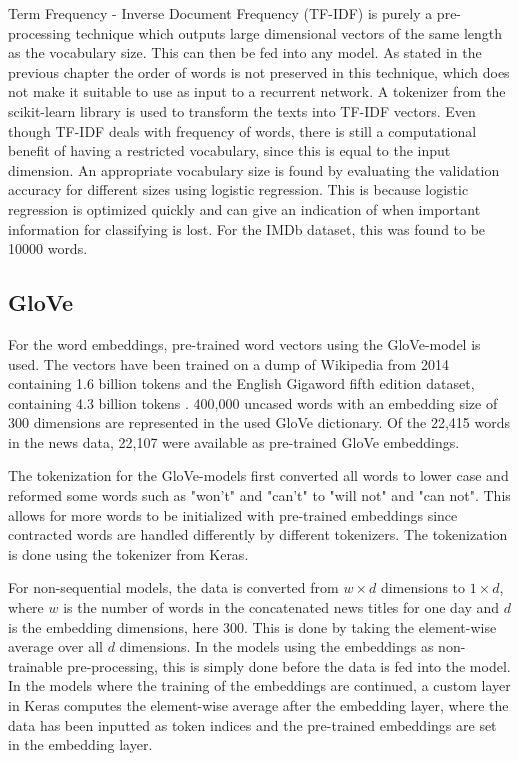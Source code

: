 Term Frequency - Inverse Document Frequency (TF-IDF) is purely a pre-processing technique which outputs large dimensional vectors of the same length as the vocabulary size. This can then be fed into any model. As stated in the previous chapter the order of words is not preserved in this technique, which does not make it suitable to use as input to a recurrent network. A tokenizer from the scikit-learn library is used to transform the texts into TF-IDF vectors. Even though TF-IDF deals with frequency of words, there is still a computational benefit of having a restricted vocabulary, since this is equal to the input dimension. An appropriate vocabulary size is found by evaluating the validation accuracy for different sizes using logistic regression. This is because logistic regression is optimized quickly and can give an indication of when important information for classifying is lost. For the IMDb dataset, this was found to be 10000 words. 

\subsection{GloVe}

For the word embeddings, pre-trained word vectors using the GloVe-model is used. The vectors have been trained on a dump of Wikipedia from 2014 containing 1.6 billion tokens and the English Gigaword fifth edition dataset, containing 4.3 billion tokens \citep{pennington2014glove}. 400,000 uncased words with an embedding size of 300 dimensions are represented in the used GloVe dictionary. Of the 22,415 words in the news data, 22,107 were available as pre-trained GloVe embeddings. 

The tokenization for the GloVe-models first converted all words to lower case and reformed some words such as "won't" and "can't" to "will not" and "can not". This allows for more words to be initialized with pre-trained embeddings since contracted words are handled differently by different tokenizers. The tokenization is done using the tokenizer from Keras.  

For non-sequential models, the data is converted from $w \times d$ dimensions to $1 \times d$, where $w$ is the number of words in the concatenated news titles for one day and $d$ is the embedding dimensions, here 300. This is done by taking the element-wise average over all $d$ dimensions. In the models using the embeddings as non-trainable pre-processing, this is simply done before the data is fed into the model. In the models where the training of the embeddings are continued, a custom layer in Keras computes the element-wise average after the embedding layer, where the data has been inputted as token indices and the pre-trained embeddings are set in the embedding layer.

